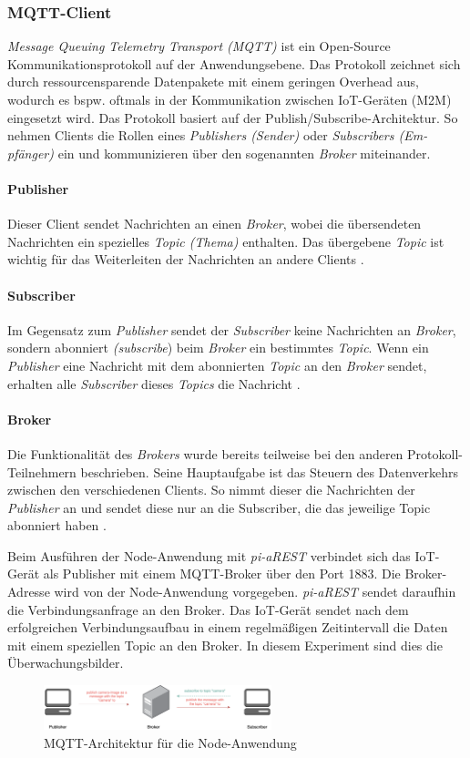 \subsubsection{MQTT-Client}
\textit{Message Queuing Telemetry Transport (MQTT)} ist ein Open-Source
Kommunikationsprotokoll auf der Anwendungsebene. Das Protokoll zeichnet sich
durch ressourcensparende Datenpakete mit einem geringen Overhead aus, wodurch
es bspw. oftmals in der Kommunikation zwischen IoT-Geräten (M2M) eingesetzt
wird. Das Protokoll basiert auf der Publish/Subscribe-Architektur. So nehmen
Clients die Rollen eines \textit{Publishers (Sender)} oder \textit{Subscribers
(Em- pfänger)} ein und kommunizieren über den sogenannten \textit{Broker}
miteinander. \cite{mqtt, wong20man}

\paragraph{Publisher} 
Dieser Client sendet Nachrichten an einen \textit{Broker}, wobei die
übersendeten Nachrichten ein spezielles \textit{Topic (Thema)} enthalten.
Das übergebene \textit{Topic} ist wichtig für das Weiterleiten der Nachrichten
an andere Clients \cite{mqtt, wong20man}.

\paragraph{Subscriber} 
Im Gegensatz zum \textit{Publisher} sendet der \textit{Subscriber} keine
Nachrichten an \textit{Broker}, sondern abonniert \textit{(subscribe}) beim
\textit{Broker} ein bestimmtes \textit{Topic}.  Wenn ein \textit{Publisher}
eine Nachricht mit dem abonnierten \textit{Topic} an den \textit{Broker}
sendet, erhalten alle \textit{Subscriber} dieses \textit{Topics} die Nachricht
\cite{mqtt, wong20man}.

\paragraph{Broker} 
Die Funktionalität des \textit{Brokers} wurde bereits teilweise bei den anderen
Protokoll-Teilnehmern beschrieben. Seine Hauptaufgabe ist das Steuern des
Datenverkehrs zwischen den verschiedenen Clients.  So nimmt dieser die
Nachrichten der \textit{Publisher} an und sendet diese nur an die Subscriber,
die das jeweilige Topic abonniert haben \cite{mqtt, wong20man}.

Beim Ausführen der Node-Anwendung mit \textit{pi-aREST} verbindet sich das
IoT-Gerät als Publisher mit einem MQTT-Broker über den Port 1883. Die
Broker-Adresse wird von der Node-Anwendung vorgegeben.  \textit{pi-aREST}
sendet daraufhin die Verbindungsanfrage an den Broker. Das IoT-Gerät sendet
nach dem erfolgreichen Verbindungsaufbau in einem regelmäßigen Zeitintervall
die Daten mit einem speziellen Topic an den Broker. In diesem Experiment sind
dies die Überwachungsbilder.

\begin{figure}[t]
  \centering
  \includegraphics[width=250px]{images/mqtt.png}
  \caption{MQTT-Architektur für die Node-Anwendung \cite{mqtt}}
  \label{fig:arch-mqtt}
\end{figure}

